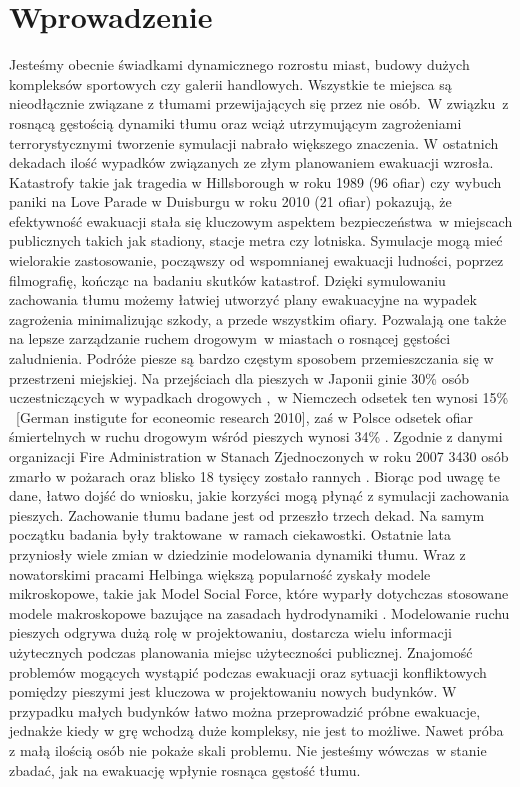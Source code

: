 \chapter{Wprowadzenie}
\label{cha:wprowadzenie}

Jesteśmy obecnie świadkami dynamicznego rozrostu miast, budowy dużych kompleksów sportowych czy galerii handlowych. Wszystkie te miejsca są nieodłącznie związane z tłumami przewijających się przez nie osób.~W związku~z rosnącą gęstością dynamiki tłumu oraz wciąż utrzymującym zagrożeniami terrorystycznymi \cite{terrorism} tworzenie symulacji nabrało większego znaczenia. W ostatnich dekadach ilość wypadków związanych ze złym planowaniem ewakuacji wzrosła. Katastrofy takie jak tragedia w Hillsborough w roku 1989 (96 ofiar) \cite{hillsborough} czy wybuch paniki na Love Parade w Duisburgu w roku 2010 (21 ofiar) \cite{lovedisaster} pokazują, że efektywność ewakuacji stała się kluczowym aspektem bezpieczeństwa~w miejscach publicznych takich jak stadiony, stacje metra czy lotniska. Symulacje mogą mieć wielorakie zastosowanie, począwszy od wspomnianej ewakuacji ludności, poprzez filmografię, kończąc na badaniu skutków katastrof. Dzięki symulowaniu zachowania tłumu możemy łatwiej utworzyć plany ewakuacyjne na wypadek zagrożenia minimalizując szkody, a przede wszystkim ofiary. Pozwalają one także na lepsze zarządzanie ruchem drogowym~w miastach o rosnącej gęstości zaludnienia.
Podróże piesze są bardzo częstym sposobem przemieszczania się w przestrzeni miejskiej. Na przejściach dla pieszych w Japonii ginie 30\% osób uczestniczących w wypadkach drogowych \cite{AMSFMfPBSaSC},~w Niemczech odsetek ten wynosi 15\% \ [German instigute for econeomic research 2010], zaś w Polsce odsetek ofiar śmiertelnych w ruchu drogowym wśród pieszych wynosi 34\% \cite{metodologiaZachowan}. Zgodnie z danymi organizacji Fire Administration w Stanach Zjednoczonych w roku 2007 3430 osób zmarło w pożarach oraz blisko 18 tysięcy zostało rannych \cite{Asfemwle}. Biorąc pod uwagę te dane, łatwo dojść do wniosku, jakie korzyści mogą płynąć z symulacji zachowania pieszych.
Zachowanie tłumu badane jest od przeszło trzech dekad. Na samym początku badania były traktowane~w ramach ciekawostki. Ostatnie lata przyniosły wiele zmian w dziedzinie modelowania dynamiki tłumu. Wraz z nowatorskimi pracami Helbinga \cite{SforceModelForPedDyn} większą popularność zyskały modele mikroskopowe, takie jak Model Social Force, które wyparły dotychczas stosowane modele makroskopowe bazujące na zasadach hydrodynamiki  \cite{SforceModelForPedDyn}. Modelowanie ruchu pieszych odgrywa dużą rolę w projektowaniu, dostarcza wielu informacji użytecznych podczas planowania miejsc użyteczności publicznej. Znajomość problemów mogących wystąpić podczas ewakuacji oraz sytuacji konfliktowych pomiędzy pieszymi jest kluczowa w projektowaniu nowych budynków. W przypadku małych budynków łatwo można przeprowadzić próbne ewakuacje, jednakże kiedy w grę wchodzą duże kompleksy, nie jest to możliwe. Nawet próba z małą ilością osób nie pokaże skali problemu. Nie jesteśmy wówczas~w stanie zbadać, jak na ewakuację wpłynie rosnąca gęstość tłumu.
